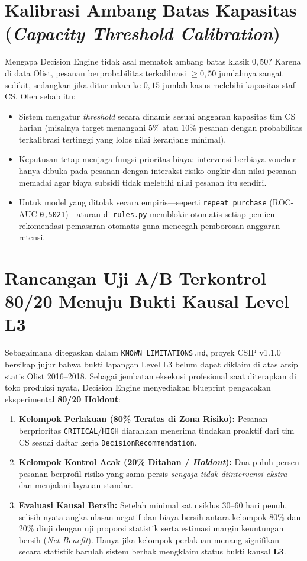 \documentclass[11pt,a4paper,oneside]{book}
\newcommand{\code}[1]{{\small\nolinkurl{#1}}}
\begin{document}
\section{Kalibrasi Ambang Batas Kapasitas (\emph{Capacity Threshold Calibration})}

Mengapa Decision Engine tidak asal mematok ambang batas klasik $0{,}50$? Karena di data Olist, pesanan berprobabilitas terkalibrasi $\ge 0{,}50$ jumlahnya sangat sedikit, sedangkan jika diturunkan ke $0{,}15$ jumlah kasus melebihi kapasitas staf CS. Oleh sebab itu:
\begin{itemize}
  \item Sistem mengatur \emph{threshold} secara dinamis sesuai anggaran kapasitas tim CS harian (misalnya target menangani $5\%$ atau $10\%$ pesanan dengan probabilitas terkalibrasi tertinggi yang lolos nilai keranjang minimal).
  \item Keputusan tetap menjaga fungsi prioritas biaya: intervensi berbiaya voucher hanya dibuka pada pesanan dengan interaksi risiko ongkir dan nilai pesanan memadai agar biaya subsidi tidak melebihi nilai pesanan itu sendiri.
  \item Untuk model yang ditolak secara empiris---seperti \code{repeat_purchase} (ROC-AUC \code{0,5021})---aturan di \code{rules.py} memblokir otomatis setiap pemicu rekomendasi pemasaran otomatis guna mencegah pemborosan anggaran retensi.
\end{itemize}

\section{Rancangan Uji A/B Terkontrol 80/20 Menuju Bukti Kausal Level L3}

Sebagaimana ditegaskan dalam \code{KNOWN_LIMITATIONS.md}, proyek CSIP v1.1.0 bersikap jujur bahwa bukti lapangan Level L3 belum dapat diklaim di atas arsip statis Olist 2016--2018. Sebagai jembatan eksekusi profesional saat diterapkan di toko produksi nyata, Decision Engine menyediakan blueprint pengacakan eksperimental \textbf{80/20 Holdout}:
\begin{enumerate}
  \item \textbf{Kelompok Perlakuan (80\% Teratas di Zona Risiko):} Pesanan berprioritas \code{CRITICAL}/\code{HIGH} diarahkan menerima tindakan proaktif dari tim CS sesuai daftar kerja \code{DecisionRecommendation}.
  \item \textbf{Kelompok Kontrol Acak (20\% Ditahan / \emph{Holdout}):} Dua puluh persen pesanan berprofil risiko yang sama persis \emph{sengaja tidak diintervensi ekstra} dan menjalani layanan standar.
  \item \textbf{Evaluasi Kausal Bersih:} Setelah minimal satu siklus 30--60 hari penuh, selisih nyata angka ulasan negatif dan biaya bersih antara kelompok 80\% dan 20\% diuji dengan uji proporsi statistik serta estimasi margin keuntungan bersih (\emph{Net Benefit}). Hanya jika kelompok perlakuan menang signifikan secara statistik barulah sistem berhak mengklaim status bukti kausal \textbf{L3}.
\end{enumerate}
\end{document}
